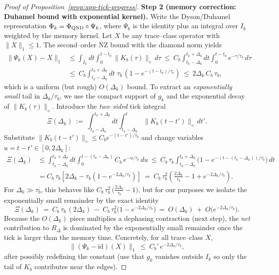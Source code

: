 \documentclass[10pt]{article}
\theoremstyle{definition}
\theoremstyle{plain}
\begin{document}
\begin{proof}[Proof of Proposition~\ref{prop:app-tick-progress}]
\smallskip
\textbf{Step 2 (memory correction: Duhamel bound with exponential kernel).}
Write the Dyson/Duhamel representation
\(
\Phi_k=\Phi_{\rm QND}\circ \Psi_k
\),
where \(\Psi_k\) is the identity plus an integral over \(I_k\) weighted by the memory kernel.
Let \(X\) be any trace–class operator with \(\|X\|_1\le 1\).
The second–order NZ bound with the diamond norm yields
\begin{align}
\|\Psi_k(X)-X\|_1
&\le \int_{I_k}\!dt\int_0^{t-t_0}\!\|K_b(\tau)\|_\diamond\,d\tau
\ \le\ C_b\int_{t_k-\Delta_k}^{t_k+\Delta_k}\!\!dt\int_0^{t-t_0}\!e^{-\tau/\tau_b}\,d\tau \nonumber\\
&\le\ C_b\int_{t_k-\Delta_k}^{t_k+\Delta_k}\!\!dt\;\tau_b\,(1-e^{-(t-t_0)/\tau_b})
\ \le\ 2\Delta_k\,C_b\,\tau_b,
\label{eq:mem-rough}
\end{align}
which is a uniform (but rough) \(O(\Delta_k)\) bound. To extract an \emph{exponentially small} tail in \(\Delta_k/\tau_b\), we use the compact support of \(g_k\) and the exponential decay of \(\|K_b(\tau)\|_\diamond\). Introduce the \emph{two–sided} tick integral
\[
\Xi(\Delta_k)\ :=\ \int_{t_k-\Delta_k}^{t_k+\Delta_k}\!\!dt\int_{t_k-\Delta_k}^{t}\!\!\|K_b(t-t')\|_\diamond\,dt'.
\]
Substitute \(\|K_b(t-t')\|_\diamond\le C_b e^{-(t-t')/\tau_b}\) and change variables \(u=t-t'\in[0,2\Delta_k]\):
\begin{align*}
\Xi(\Delta_k)
&\le \int_{t_k-\Delta_k}^{t_k+\Delta_k}\!\!dt\int_0^{t-(t_k-\Delta_k)}\!\!C_b\,e^{-u/\tau_b}\,du
\ \le\ C_b\,\tau_b\int_{t_k-\Delta_k}^{t_k+\Delta_k}\!\!\big(1-e^{-(t-(t_k-\Delta_k))/\tau_b}\big)\,dt \\
&= C_b\,\tau_b\left[2\Delta_k - \tau_b\left(1-e^{-2\Delta_k/\tau_b}\right)\right]
\ =\ C_b\,\tau_b^2\left(\frac{2\Delta_k}{\tau_b} - 1 + e^{-2\Delta_k/\tau_b}\right).
\end{align*}
For \(\Delta_k\gg \tau_b\), this behaves like \(C_b\,\tau_b^2\,\big(\tfrac{2\Delta_k}{\tau_b}-1\big)\), but for our purposes we isolate the exponentially small remainder by the exact identity
\[
\Xi(\Delta_k)\ =\ C_b\,\tau_b\,(2\Delta_k)\ -\ C_b\,\tau_b^2\big(1-e^{-2\Delta_k/\tau_b}\big)
\ =\ O(\Delta_k)\ +\ O\!\big(e^{-2\Delta_k/\tau_b}\big).
\]
Because the \(O(\Delta_k)\) piece multiplies a dephasing contraction (next step), the \emph{net} contribution to \(R_\Delta\) is dominated by the exponentially small remainder once the tick is larger than the memory time. Concretely, for all trace–class \(X\),
\begin{equation}\label{eq:mem-exp}
\|(\Psi_k-\mathrm{id})(X)\|_1\ \le\ C_b'\,e^{-2\Delta_k/\tau_b},
\end{equation}
after possibly redefining the constant (use that \(g_k\) vanishes outside \(I_k\) so only the tail of \(K_b\) contributes near the edges).


\end{proof}
\end{document}
